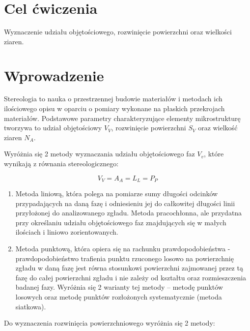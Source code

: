 \documentclass[a4paper,12pt]{article}
\begin{document}
    



\section{Cel ćwiczenia}

Wyznaczenie udziału objętościowego, rozwinięcie powierzchni oraz wielkości ziaren.

\section{Wprowadzenie}

Stereologia to nauka o przestrzennej budowie materiałów i metodach ich ilościowego opisu w oparciu o pomiary wykonane na płaskich przekrojach materiałów. Podstawowe parametry charakteryzujące elementy mikrostrukturę tworzywa to udział objętościowy $V_V$, rozwinięcie powierzchni $S_V$ oraz wielkość ziaren $N_A$.

Wyróżnia się 2 metody wyznaczania udziału objętościowego faz $V_v$, które wynikają z równania stereologicznego:

$$V_V=A_A=L_L=P_P$$

\begin{enumerate}
    \item Metoda liniową, która polega na pomiarze sumy długości  odcinków przypadających na daną fazę i odniesieniu jej do całkowitej długości linii przyłożonej do analizowanego zgładu. Metoda pracochłonna, ale przydatna przy określaniu udziału objętościowego faz znajdujących się w małych ilościach i liniowo zorientowanych. 
    \item Metoda punktową, która opiera się na rachunku prawdopodobieństwa - prawdopodobieństwo trafienia punktu rzuconego losowo na powierzchnię zgładu w daną fazę jest równa stosunkowi powierzchni zajmowanej przez tą fazę do całej powierzchni zgładu i nie zależy od kształtu oraz rozmieszczenia badanej fazy. Wyróżnia się 2 warianty tej metody – metodę punktów losowych oraz metodę punktów rozłożonych systematycznie (metoda siatkowa).
\end{enumerate}

\newpage

Do wyznaczenia rozwinięcia powierzchniowego wyróżnia się 2 metody:
\end{document}
